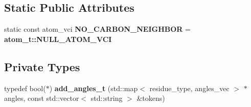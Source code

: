 \subsection*{Static Public Attributes}
\begin{CompactItemize}
\item 
static const atom\_\-vci \textbf{NO\_\-CARBON\_\-NEIGHBOR} = \bf{atom\_\-t::NULL\_\-ATOM\_\-VCI}\label{classSimSite3D_1_1HbondPoints_ada240a8c1e41ce847e1a4d02d08eba8}

\end{CompactItemize}
\subsection*{Private Types}
\begin{CompactItemize}
\item 
typedef bool($\ast$) \textbf{add\_\-angles\_\-t} (std::map$<$ residue\_\-type, angles\_\-vec $>$ $\ast$angles, const std::vector$<$ std::string $>$ \&tokens)\label{classSimSite3D_1_1HbondPoints_7fcd7708b6fd8bdae05d31921b01749d}

\end{CompactItemize}
